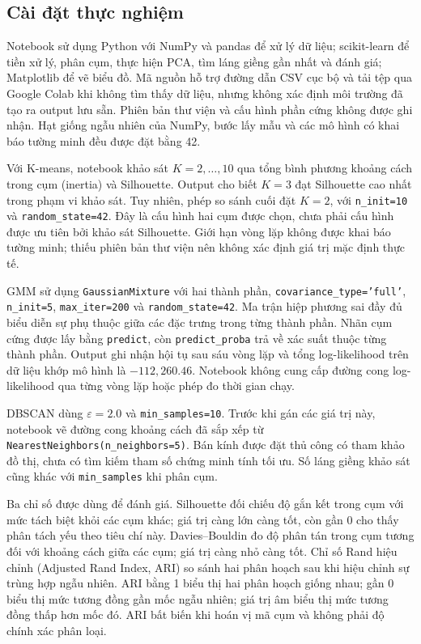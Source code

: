 \subsection{Cài đặt thực nghiệm}
Notebook sử dụng Python với NumPy và pandas để xử lý dữ liệu;
scikit-learn để tiền xử lý, phân cụm, thực hiện PCA, tìm láng giềng gần nhất
và đánh giá; Matplotlib để vẽ biểu đồ. Mã nguồn hỗ trợ đường dẫn CSV cục bộ
và tải tệp qua Google Colab khi không tìm thấy dữ liệu, nhưng không xác định
môi trường đã tạo ra output lưu sẵn. Phiên bản thư viện và cấu hình phần cứng
không được ghi nhận. Hạt giống ngẫu nhiên của NumPy, bước lấy mẫu và
các mô hình có khai báo tường minh đều được đặt bằng 42.

Với K-means, notebook khảo sát $K=2,\ldots,10$ qua tổng bình phương khoảng
cách trong cụm (inertia) và Silhouette. Output cho biết $K=3$ đạt Silhouette
cao nhất trong phạm vi khảo sát. Tuy nhiên, phép so sánh cuối đặt $K=2$,
với \texttt{n\_init=10} và \texttt{random\_state=42}. Đây là cấu hình
hai cụm được chọn, chưa phải cấu hình được ưu tiên bởi khảo sát Silhouette.
Giới hạn vòng lặp không được khai báo tường minh; thiếu phiên bản thư viện
nên không xác định giá trị mặc định thực tế.

GMM sử dụng \texttt{GaussianMixture} với hai thành phần,
\texttt{covariance\_type='full'}, \texttt{n\_init=5},
\texttt{max\_iter=200} và \texttt{random\_state=42}. Ma trận hiệp phương sai
đầy đủ biểu diễn sự phụ thuộc giữa các đặc trưng trong từng thành phần.
Nhãn cụm cứng được lấy bằng \texttt{predict}, còn \texttt{predict\_proba}
trả về xác suất thuộc từng thành phần. Output ghi nhận hội tụ sau sáu vòng
lặp và tổng log-likelihood trên dữ liệu khớp mô hình là $-112{,}260.46$.
Notebook không cung cấp đường cong log-likelihood qua từng vòng lặp
hoặc phép đo thời gian chạy.

DBSCAN dùng $\varepsilon=2.0$ và \texttt{min\_samples=10}.
Trước khi gán các giá trị này, notebook vẽ đường cong khoảng cách đã sắp
xếp từ \texttt{NearestNeighbors(n\_neighbors=5)}. Bán kính được đặt thủ công
có tham khảo đồ thị, chưa có tìm kiếm tham số chứng minh tính tối ưu.
Số láng giềng khảo sát cũng khác với \texttt{min\_samples} khi phân cụm.

Ba chỉ số được dùng để đánh giá. Silhouette đối chiếu độ gắn kết trong cụm
với mức tách biệt khỏi các cụm khác; giá trị càng lớn càng tốt, còn gần 0
cho thấy phân tách yếu theo tiêu chí này. Davies--Bouldin đo độ phân tán
trong cụm tương đối với khoảng cách giữa các cụm; giá trị càng nhỏ càng tốt.
Chỉ số Rand hiệu chỉnh (Adjusted Rand Index, ARI) so sánh hai phân hoạch
sau khi hiệu chỉnh sự trùng hợp ngẫu nhiên. ARI bằng 1 biểu thị hai phân
hoạch giống nhau; gần 0 biểu thị mức tương đồng gần mốc ngẫu nhiên;
giá trị âm biểu thị mức tương đồng thấp hơn mốc đó. ARI bất biến khi
hoán vị mã cụm và không phải độ chính xác phân loại.

